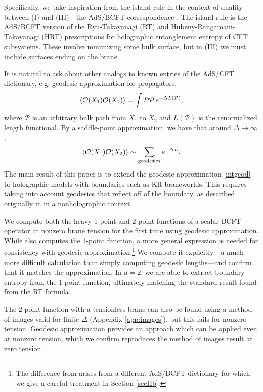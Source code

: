 \documentclass[reprint,amsmath,amssymb,aps,nofootinbib,twocolumn]{revtex4-2}
\begin{document}
Specifically, we take inspiration from the island rule in the context of duality between (I) and (III)---the AdS/BCFT correspondence \cite{Takayanagi:2011zk,Fujita:2011fp}. The island rule is the AdS/BCFT version of the Ryu-Takayanagi (RT) \cite{Ryu:2006bv} and Hubeny-Rangamani-Takayanagi (HRT) \cite{Hubeny:2007xt} prescriptions for holographic entanglement entropy of CFT subsystems. These involve minimizing some bulk surface, but in (III) we must include surfaces ending on the brane.

It is natural to ask about other analogs to known entries of the AdS/CFT dictionary, e.g. geodesic approximation for propagators,
\begin{equation}
\expval{\mathcal{O}(X_1) \mathcal{O}(X_2)} = \int \mathcal{D}\mathcal{P}\,e^{-\Delta L(\mathcal{P})},
\end{equation}
where $\mathcal{P}$ is an arbitrary bulk path from $X_1$ to $X_2$ and $L(\mathcal{P})$ is the renormalized length functional. By a saddle-point approximation, we have that around $\Delta \to \infty$,
\begin{equation}
\expval{\mathcal{O}(X_1)\mathcal{O}(X_2)} \sim \sum_{\text{geodesics}} e^{-\Delta L}.
\label{intgeod}
\end{equation}
The main result of this paper is to extend the geodesic approximation \eqref{intgeod} to holographic models with boundaries such as KR braneworlds. This requires taking into account geodesics that reflect off of the boundary, as described originally in \cite{McAvity_1991,mcavity_asymptotic_1991,mcavity_quantum_1993} in a nonholographic context.

We compute both the heavy 1-point and 2-point functions of a scalar BCFT operator at nonzero brane tension for the first time using geodesic approximation. While \cite{Fujita:2011fp} also computes the 1-point function, a more general expression is needed for consistency with geodesic approximation.\footnote{The difference from \cite{Fujita:2011fp} arises from a different AdS\slash BCFT dictionary for which we give a careful treatment in Section \ref{secIIb}.} We compute it explicitly---a much more difficult calculation than simply computing geodesic lengths---and confirm that it matches the approximation. In $ d=2 $, we are able to extract boundary entropy from the 1-point function, ultimately matching the standard result found from the RT formula \cite{Takayanagi:2011zk}.

The 2-point function with a tensionless brane \cite{Alishahiha:2011rg,Almheiri:2018ijj} can also be found using a method of images valid for finite $\Delta$ (Appendix \ref{app:images}), but this fails for nonzero tension. Geodesic approximation provides an approach which can be applied even at nonzero tension, which we confirm reproduces the method of images result at zero tension.
\end{document}
